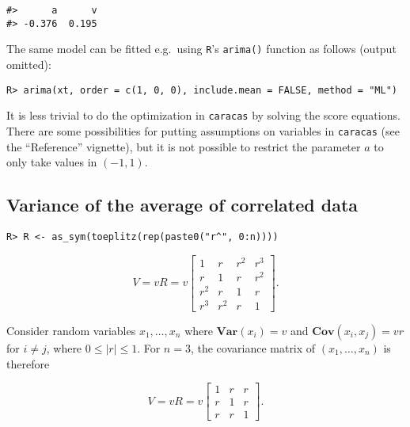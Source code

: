 \begin{verbatim}
#>      a      v 
#> -0.376  0.195
\end{verbatim}

The same model can be fitted e.g.~using \texttt{R}'s \texttt{arima()} function as follows (output omitted):

\begin{verbatim}
R> arima(xt, order = c(1, 0, 0), include.mean = FALSE, method = "ML")
\end{verbatim}

It is less trivial to do the optimization in \texttt{caracas} by solving the score equations.
There are some possibilities for putting assumptions on variables
in \texttt{caracas} (see the ``Reference'' vignette), but
it is not possible to restrict the parameter \(a\) to only take values in \((-1, 1)\).

\hypertarget{variance-of-the-average-of-correlated-data}{%
\subsection{Variance of the average of correlated data}\label{variance-of-the-average-of-correlated-data}}

\begin{verbatim}
R> R <- as_sym(toeplitz(rep(paste0("r^", 0:n))))
\end{verbatim}

\begin{equation}
  \label{eq:1}
  V= v R = v \left[\begin{matrix}1 & r & r^{2} & r^{3}\\r & 1 & r & r^{2}\\r^{2} & r & 1 & r\\r^{3} & r^{2} & r & 1\end{matrix}\right]. 
\end{equation}

Consider random
variables \(x_1,\dots, x_n\) where \(\mathbf{Var}(x_i)=v\) and \(\mathbf{Cov}(x_i, x_j)=v r\) for \(i\not = j\), where \(0 \le |r| \le1\).
For \(n=3\), the covariance matrix of \((x_1,\dots, x_n)\) is therefore

\begin{equation}
  \label{eq:1}
  V= v R = v \left[\begin{matrix}1 & r & r\\r & 1 & r\\r & r & 1\end{matrix}\right]. 
\end{equation}

